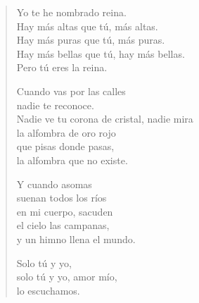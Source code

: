 \documentclass[12pt]{article}
\begin{document}
\clearpage
{}
\begin{verse}

Yo te he nombrado reina.\\
Hay más altas que tú, más altas.\\
Hay más puras que tú, más puras.\\
Hay más bellas que tú, hay más bellas.\\
Pero tú eres la reina.  

Cuando vas por las calles\\
nadie te reconoce.\\
Nadie ve tu corona de cristal, nadie mira\\
la alfombra de oro rojo\\
que pisas donde pasas,\\
la alfombra que no existe.  

Y cuando asomas\\
suenan todos los ríos\\
en mi cuerpo, sacuden\\
el cielo las campanas,\\
y un himno llena el mundo.  

Solo tú y yo,\\
solo tú y yo, amor mío,\\
lo escuchamos.  

\end{verse}
\end{document}
